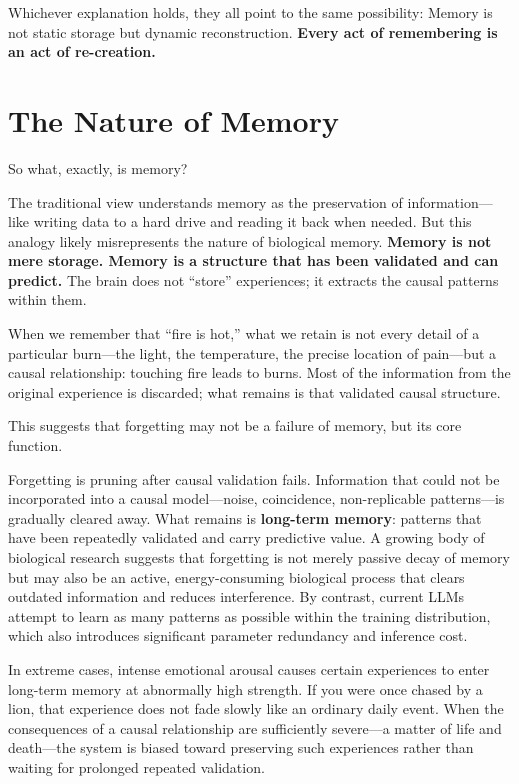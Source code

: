 \vspace{1em}

Whichever explanation holds, they all point to the same possibility:
Memory is not static storage but dynamic reconstruction. \textbf{Every act of remembering is an act of re-creation.}

\newpage
\section{The Nature of Memory}

So what, exactly, is memory?

The traditional view understands memory as the preservation of information---like writing data to a hard drive and reading it back when needed.
But this analogy likely misrepresents the nature of biological memory.
\textbf{Memory is not mere storage. Memory is a structure that has been validated and can predict.}
The brain does not ``store'' experiences; it extracts the causal patterns within them.

When we remember that ``fire is hot,'' what we retain is not every detail of a particular burn---the light, the temperature, the precise location of pain---but a causal relationship: touching fire leads to burns. Most of the information from the original experience is discarded; what remains is that validated causal structure.

\vspace{1em}

This suggests that forgetting may not be a failure of memory, but its core function.

Forgetting is pruning after causal validation fails. Information that could not be incorporated into a causal model---noise, coincidence, non-replicable patterns---is gradually cleared away. What remains is \textbf{long-term memory}: patterns that have been repeatedly validated and carry predictive value.
A growing body of biological research suggests that forgetting is not merely passive decay of memory but may also be an active, energy-consuming biological process that clears outdated information and reduces interference. By contrast, current LLMs attempt to learn as many patterns as possible within the training distribution, which also introduces significant parameter redundancy and inference cost.

\vspace{1em}

In extreme cases, intense emotional arousal causes certain experiences to enter long-term memory at abnormally high strength. If you were once chased by a lion, that experience does not fade slowly like an ordinary daily event. When the consequences of a causal relationship are sufficiently severe---a matter of life and death---the system is biased toward preserving such experiences rather than waiting for prolonged repeated validation.

